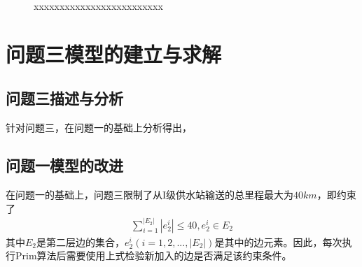 \documentclass{whutmod}
\begin{document}
			\begin{figure}[H]	
				\centering
				\caption{xxxxxxxxxxxxxxxxxxxxxxxxx}
				\label{fisg}
			\end{figure}

    \section{问题三模型的建立与求解}
   		\subsection{问题三描述与分析}
   		针对问题三，在问题一的基础上分析得出，
    	\subsection{问题一模型的改进}
    	在问题一的基础上，问题三限制了从I级供水站输送的总里程最大为$40km$，即约束了
    	\begin{gather*}
    	\sum_{i=1}^{|E_2|}|e_2^i|\leq 40,e_2^i\in E_2
    	\end{gather*}
    	其中$E_2$是第二层边的集合，$e_2^i(i=1,2,...,|E_2|)$是其中的边元素。因此，每次执行Prim算法后需要使用上式检验新加入的边是否满足该约束条件。
    	
\end{document}

